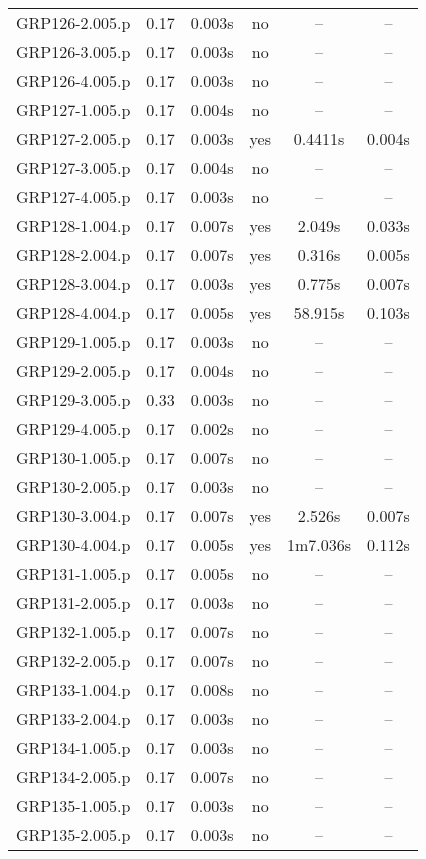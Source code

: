\begin{center}
\begin{longtable}{||c | c | c | c | c | c||}
GRP126-2.005.p & 0.17 & 0.003s & no & -- & -- \\
GRP126-3.005.p & 0.17 & 0.003s & no & -- & -- \\
GRP126-4.005.p & 0.17 & 0.003s & no & -- & -- \\
GRP127-1.005.p & 0.17 & 0.004s & no & -- & -- \\
GRP127-2.005.p & 0.17 & 0.003s & yes & 0.4411s & 0.004s \\
GRP127-3.005.p & 0.17 & 0.004s & no & -- & -- \\
GRP127-4.005.p & 0.17 & 0.003s & no & -- & -- \\
GRP128-1.004.p & 0.17 & 0.007s & yes & 2.049s & 0.033s \\
GRP128-2.004.p & 0.17 & 0.007s & yes & 0.316s & 0.005s \\
GRP128-3.004.p & 0.17 & 0.003s & yes & 0.775s & 0.007s \\
GRP128-4.004.p & 0.17 & 0.005s & yes & 58.915s & 0.103s \\
GRP129-1.005.p & 0.17 & 0.003s & no & -- & -- \\
GRP129-2.005.p & 0.17 & 0.004s & no & -- & -- \\
GRP129-3.005.p & 0.33 & 0.003s & no & -- & -- \\
GRP129-4.005.p & 0.17 & 0.002s & no & -- & -- \\
GRP130-1.005.p & 0.17 & 0.007s & no & -- & -- \\
GRP130-2.005.p & 0.17 & 0.003s & no & -- & -- \\
GRP130-3.004.p & 0.17 & 0.007s & yes & 2.526s & 0.007s \\
GRP130-4.004.p & 0.17 & 0.005s & yes & 1m7.036s & 0.112s \\
GRP131-1.005.p & 0.17 & 0.005s & no & -- & -- \\
GRP131-2.005.p & 0.17 & 0.003s & no & -- & -- \\
GRP132-1.005.p & 0.17 & 0.007s & no & -- & -- \\
GRP132-2.005.p & 0.17 & 0.007s & no & -- & -- \\
GRP133-1.004.p & 0.17 & 0.008s & no & -- & -- \\
GRP133-2.004.p & 0.17 & 0.003s & no & -- & -- \\
GRP134-1.005.p & 0.17 & 0.003s & no & -- & -- \\
GRP134-2.005.p & 0.17 & 0.007s & no & -- & -- \\
GRP135-1.005.p & 0.17 & 0.003s & no & -- & -- \\
GRP135-2.005.p & 0.17 & 0.003s & no & -- & -- \\

\end{longtable}
\end{center}
